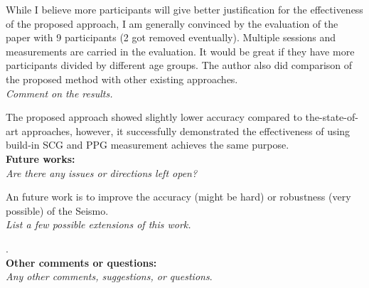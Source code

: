 \documentclass[11pt, oneside]{article}   	%
\begin{document}
While I believe more participants will give better justification for the effectiveness of the proposed approach, I am generally convinced by the evaluation of the paper with 9 participants (2 got removed eventually). Multiple sessions and measurements are carried in the evaluation. It would be great if they have more participants divided by different age groups. The author also did comparison of the proposed method with other existing approaches.\\

\noindent \emph{Comment on the results.}

The proposed approach showed slightly lower accuracy compared to the-state-of-art approaches, however, it successfully demonstrated the effectiveness of using build-in SCG and PPG measurement achieves the same purpose.\\


\noindent \textbf{Future works:}\\
\emph{Are there any issues or directions left open?}

An future work is to improve the accuracy (might be hard) or robustness (very possible) of the Seismo. \\

\noindent \emph{List a few possible extensions of this work.}

. \\


\noindent \textbf{Other comments or questions:}\\
\emph{Any other comments, suggestions, or questions}.
\end{document}

